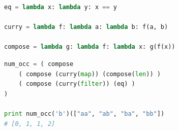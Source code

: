 \documentclass[ignorenonframetext,aspectratio=169]{beamer}
\begin{document}
\begin{frame}[fragile]
\begin{lstlisting}[language=Python]
eq = lambda x: lambda y: x == y

curry = lambda f: lambda a: lambda b: f(a, b)

compose = lambda g: lambda f: lambda x: g(f(x))
\end{lstlisting}
\end{frame}

\begin{frame}[fragile]
\begin{lstlisting}[language=Python]
num_occ = ( compose
    ( compose (curry(map)) (compose(len)) )
    ( compose (curry(filter)) (eq) )
)

print num_occ('b')(["aa", "ab", "ba", "bb"])
# [0, 1, 1, 2]
\end{lstlisting}
\end{frame}

\begin{frame}[plain]
\centering
{}
\end{frame}
\end{document}
